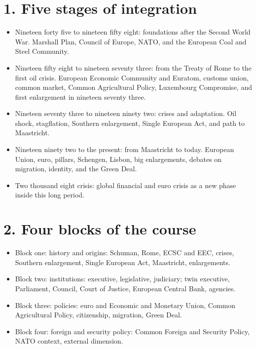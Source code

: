\documentclass[10pt,a4paper]{article}
\begin{document}
\section*{1. Five stages of integration}
\begin{itemize}
\item Nineteen forty five to nineteen fifty eight: foundations after the Second World War. Marshall Plan, Council of Europe, NATO, and the European Coal and Steel Community.
\item Nineteen fifty eight to nineteen seventy three: from the Treaty of Rome to the first oil crisis. European Economic Community and Euratom, customs union, common market, Common Agricultural Policy, Luxembourg Compromise, and first enlargement in nineteen seventy three.
\item Nineteen seventy three to nineteen ninety two: crises and adaptation. Oil shock, stagflation, Southern enlargement, Single European Act, and path to Maastricht.
\item Nineteen ninety two to the present: from Maastricht to today. European Union, euro, pillars, Schengen, Lisbon, big enlargements, debates on migration, identity, and the Green Deal.
\item Two thousand eight crisis: global financial and euro crisis as a new phase inside this long period.
\end{itemize}

\section*{2. Four blocks of the course}
\begin{itemize}
\item Block one: history and origins: Schuman, Rome, ECSC and EEC, crises, Southern enlargement, Single European Act, Maastricht, enlargements.
\item Block two: institutions: executive, legislative, judiciary; twin executive, Parliament, Council, Court of Justice, European Central Bank, agencies.
\item Block three: policies: euro and Economic and Monetary Union, Common Agricultural Policy, citizenship, migration, Green Deal.
\item Block four: foreign and security policy: Common Foreign and Security Policy, NATO context, external dimension.
\end{itemize}
\end{document}
